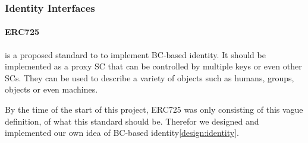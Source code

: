\subsubsection{Identity Interfaces}

\paragraph{ERC725} is a proposed standard to to implement BC-based identity. It should be implemented as a proxy SC that can be controlled by multiple keys or even other SCs. They can be used to describe a variety of objects such as humans, groups, objects or even machines. 

By the time of the start of this project, ERC725 was only consisting of this vague definition, of what this standard should be. Therefor we designed and implemented our own idea of BC-based identity\ref{design:identity}. 
